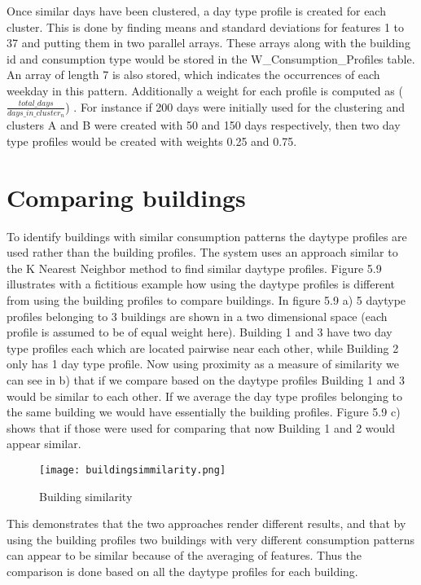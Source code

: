 Once similar days have been clustered, a day type profile is created for each cluster. This is done by finding means and standard deviations for features 1 to 37 and putting them in two parallel arrays. These arrays along with the building id and consumption type would be stored in the W\_Consumption\_Profiles table. An array of length 7 is also stored, which indicates the occurrences of each weekday in this pattern. Additionally a weight for each profile is computed as ($\frac{total\_days}{days\_in\_cluster_n}$)	. For instance if 200 days were initially used for the clustering and clusters A and B were created with 50 and 150 days respectively, then two day type profiles would be created with weights 0.25 and 0.75.
\section{Comparing buildings}
To identify buildings with similar consumption patterns the daytype profiles are used rather than the building profiles. The system uses an approach similar to the K Nearest Neighbor method to find similar daytype profiles. Figure 5.9 illustrates with a fictitious example how using the daytype profiles is different from using the building profiles to compare buildings. In figure 5.9 a) 5 daytype profiles belonging to 3 buildings are shown in a two dimensional space (each profile is assumed to be of equal weight here). Building 1 and 3 have two day type profiles each which are located pairwise near each other, while Building 2 only has 1 day type profile. Now using proximity as a measure of similarity we can see in b) that if we compare based on the daytype profiles Building 1 and 3 would be similar to each other. If we average the day type profiles belonging to the same building we would have essentially the building profiles. Figure 5.9 c) shows that if those were used for comparing that now Building 1 and 2 would appear similar. 
\begin{figure}
\begin{center}
\texttt{[image: buildingsimmilarity.png]}
\end{center}
\caption{Building similarity}
\end{figure}
This demonstrates that the two approaches render different results, and that by using the building profiles two buildings with very different consumption patterns can appear to be similar because of the averaging of features. Thus the comparison is done based on all the daytype profiles for each building.

